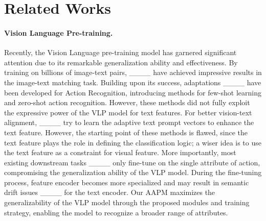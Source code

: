 \section{Related Works}
\label{related}


\paragraph{Vision Language Pre-training.}

Recently, the Vision Language pre-training model has garnered significant attention due to its remarkable generalization ability and effectiveness. By training on billions of image-text pairs, ____ have achieved impressive results in the image-text matching task. Building upon its success, adaptations ____ have been developed for Action Recognition, introducing methods for few-shot learning and zero-shot action recognition. However, these methods did not fully exploit the expressive power of the VLP model for text features. For better vision-text alignment, ____ try to learn the adaptive text prompt vectors to enhance the text feature. However, the starting point of these methods is flawed, since the text feature plays the role in defining the classification logic; a wiser idea is to use the text feature as a constraint for visual feature. More importantly, most existing downstream tasks ____ only fine-tune on the single attribute of action, compromising the generalization ability of the VLP model. During the fine-tuning process, feature encoder becomes more specialized and may result in semantic drift issues ____ for the text encoder. Our AAPM maximizes the generalizability of the VLP model through the proposed modules and training strategy, enabling the model to recognize a broader range of attributes.


